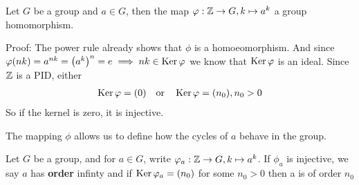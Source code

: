 \begin{lemma}[]
 Let $G$ be a group and $a \in G$, then the map $\varphi: \mathbb{Z} \to G, k \mapsto a^{k}$ a group homomorphism.
\end{lemma}
Proof: The power rule already shows that $\phi$ is a homoeomorphism. And since $\varphi(nk) = a^{nk} = \left(a^{k}\right)^{n} = e \implies nk \in \operatorname{Ker} \varphi$ we know that $\operatorname{Ker} \varphi$ is an ideal. Since $\mathbb{Z}$ is a PID, either
\begin{align*}
	\operatorname{Ker} \varphi = (0) \quad \text{or} \quad \operatorname{Ker} \varphi = (n_0), n_0 > 0
\end{align*}
So if the kernel is zero, it is injective.

The mapping $\phi$ allows us to define how the cycles of $a$ behave in the group.

\begin{definition}[order]
	Let $G$ be a group, and for $a \in G$, write $\varphi_a: \mathbb{Z} \to G, k \mapsto a^k$. If $\phi_a$ is injective, we say $a$ has \textbf{order} infinty and if $\operatorname{Ker} \varphi_a = (n_0)$ for some $n_0 > 0$ then a is of order $n_0$
\end{definition}
